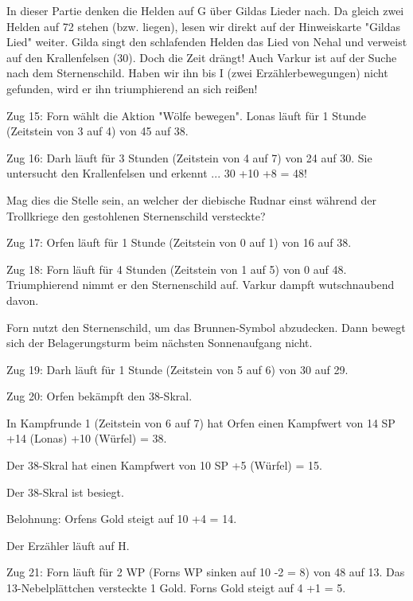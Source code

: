 \documentclass[10pt, a4paper, oneside]{book}
\begin{document}
{In dieser Partie denken die Helden auf G über Gildas Lieder nach. Da gleich zwei Helden auf 72 stehen (bzw. liegen), lesen wir direkt auf der Hinweiskarte "Gildas Lied" weiter. Gilda singt den schlafenden Helden das Lied von Nehal und verweist auf den Krallenfelsen (30). Doch die Zeit drängt! Auch Varkur ist auf der Suche nach dem Sternenschild. Haben wir ihn bis I (zwei Erzählerbewegungen) nicht gefunden, wird er ihn triumphierend an sich reißen!



Zug 15: Forn wählt die Aktion "Wölfe bewegen". Lonas läuft für 1 Stunde (Zeitstein von 3 auf 4) von 45 auf 38.



Zug 16: Darh läuft für 3 Stunden (Zeitstein von 4 auf 7) von 24 auf 30. Sie untersucht den Krallenfelsen und erkennt ... 30 +10 +8 = 48!

Mag dies die Stelle sein, an welcher der diebische Rudnar einst während der Trollkriege den gestohlenen Sternenschild versteckte?



Zug 17: Orfen läuft für 1 Stunde (Zeitstein von 0 auf 1) von 16 auf 38.



Zug 18: Forn läuft für 4 Stunden (Zeitstein von 1 auf 5) von 0 auf 48. Triumphierend nimmt er den Sternenschild auf. Varkur dampft wutschnaubend davon.

Forn nutzt den Sternenschild, um das Brunnen-Symbol abzudecken. Dann bewegt sich der Belagerungsturm beim nächsten Sonnenaufgang nicht.



Zug 19: Darh läuft für 1 Stunde (Zeitstein von 5 auf 6) von 30 auf 29.



Zug 20: Orfen bekämpft den 38-Skral.

In Kampfrunde 1 (Zeitstein von 6 auf 7) hat Orfen einen Kampfwert von 14 SP +14 (Lonas) +10 (Würfel) = 38.

Der 38-Skral hat einen Kampfwert von 10 SP +5 (Würfel) = 15.

Der 38-Skral ist besiegt.

Belohnung: Orfens Gold steigt auf 10 +4 = 14.

Der Erzähler läuft auf H.



Zug 21: Forn läuft für 2 WP (Forns WP sinken auf 10 -2 = 8) von 48 auf 13. Das 13-Nebelplättchen versteckte 1 Gold. Forns Gold steigt auf 4 +1 = 5.



}
\end{document}
